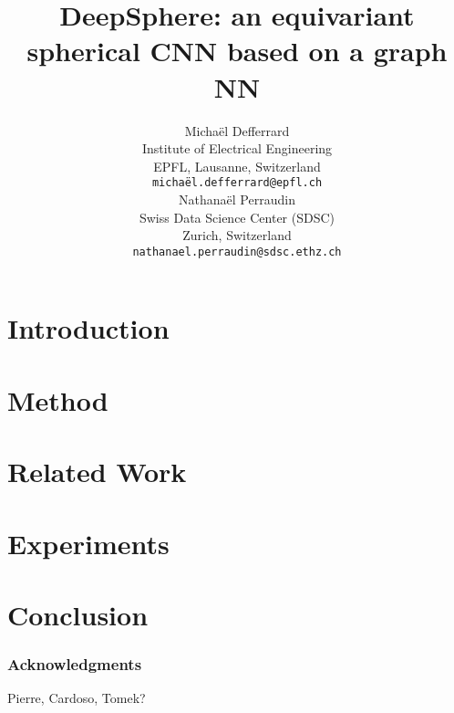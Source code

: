 \documentclass{article} %
\title{DeepSphere: an equivariant spherical CNN based on a graph NN}
\author{Michaël Defferrard \\
Institute of Electrical Engineering \\
EPFL, Lausanne, Switzerland \\
\texttt{michaël.defferrard@epfl.ch} \\
\And
Nathanaël Perraudin \\
Swiss Data Science Center (SDSC) \\
Zurich, Switzerland \\
\texttt{nathanael.perraudin@sdsc.ethz.ch} \\
}
\newcommand{\todo}[1]{{\color[rgb]{.6,.1,.6}{#1}}}
\begin{document}
\maketitle

\begin{abstract}
	\todo{todo}
\end{abstract}

\section{Introduction}

\section{Method}

\section{Related Work}

\section{Experiments}

\section{Conclusion}

\subsubsection*{Acknowledgments}

Pierre, Cardoso, Tomek?



\end{document}

